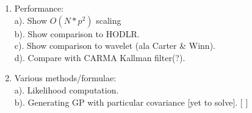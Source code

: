 \documentclass[manuscript, letterpaper]{aastex6}
\begin{document}
\begin{enumerate}
\item Performance:\\
  a). Show $O(N*p^2)$ scaling\\
  b). Show comparison to HODLR.\\
  c). Show comparison to wavelet (ala Carter \& Winn).\\
  d). Compare with CARMA Kallman filter(?).
\item Various methods/formulae:\\
  a). Likelihood computation.\\
  b). Generating GP with particular covariance [yet to solve]. [ ]\\

\end{enumerate}
\end{document}
